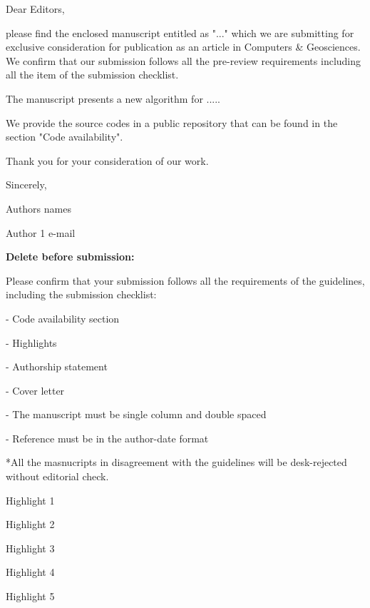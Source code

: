 \documentclass[a4paper,fleqn]{cas-sc}
\begin{document}
\begin{coverletter}

Dear Editors,
\newline
 
please find the enclosed manuscript entitled as "..." which we are submitting for exclusive consideration for publication as an article in Computers \& Geosciences. We confirm that our submission follows all the pre-review requirements including all the item of the submission checklist.  
\newline
 
The manuscript presents a new algorithm for ..... 
\newline

We provide the source codes in a public repository that can be found in the section "Code availability".
\newline

Thank you for your consideration of our work. 
\newline

Sincerely,
\newline

Authors names

Author 1 e-mail
\newline

\textbf{Delete before submission:}

Please confirm that your submission follows all the requirements of the guidelines, including the submission checklist:

- Code availability section 

- Highlights

- Authorship statement

- Cover letter

- The manuscript must be single column and double spaced

- Reference must be in the author-date format

*All the masnucripts in disagreement with the guidelines will be desk-rejected without editorial check.



\end{coverletter}

 
\begin{highlights}
\item Highlight 1
\item Highlight 2
\item Highlight 3
\item Highlight 4
\item Highlight 5
\end{highlights}
\end{document}
